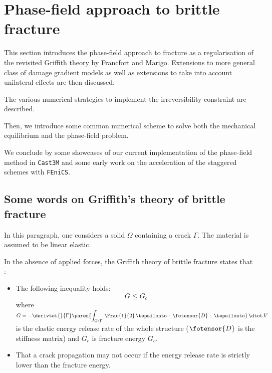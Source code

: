\section{Phase-field approach to brittle fracture}
\label{sec:pf}

This section introduces the phase-field approach to fracture as a
regularisation of the revisited Griffith theory by Francfort and Marigo.
Extensions to more general class of damage gradient models as well as
extensions to take into account unilateral effects are then discussed.

The various numerical strategies to implement the irreversibility constraint are described.

Then, we introduce some common numerical scheme to solve both the
mechanical equilibrium and the phase-field problem.

We conclude by some showcases of our current implementation of the
phase-field method in \texttt{Cast3M} and some early work on the acceleration
of the staggered schemes with \texttt{FEniCS}.

\subsection{Some words on Griffith's theory of brittle fracture}

In this paragraph, one considers a solid \(\Omega\) containing a crack
\(\Gamma\). The material is assumed to be linear elastic.

In the absence of applied forces, the Griffith theory of brittle
fracture states that \cite{francfort_revisiting_1998}:

\begin{itemize}
    \item The following inequality holds:
    \[
    G \leq G_{c}
    \]
    where \(G=-\derivtot{}{\Gamma}\paren{\displaystyle\int_{\Omega\backslash\Gamma}\,\Frac{1}{2}\,\tepsilonto\,
    \colon\,\fotensor{D}\,\colon\,\tepsilonto}\,\dtot\,V\)
    is the elastic energy release rate of the whole structure
    (\(\fotensor{D}\) is the stiffness matrix) and
    \(G_{c}\) is fracture energy \(G_{c}\).
    \item That a crack propagation may not occur if the energy release rate is
    strictly lower than the fracture energy.
\end{itemize}


